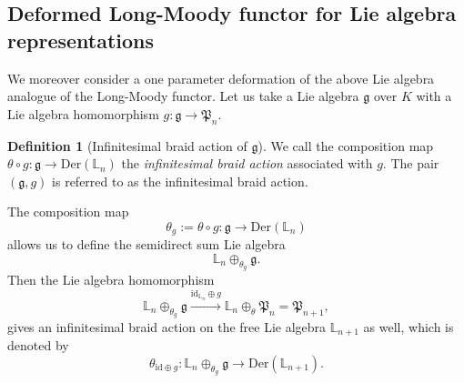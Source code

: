 \documentclass[a4paper,12pt]{article}
\theoremstyle{definition}
\newtheorem{df}[thm]{Definition}
\theoremstyle{remark}
\begin{document}
\subsection{Deformed Long-Moody functor for Lie algebra representations}
We moreover consider a one parameter deformation of the above Lie algebra analogue of the Long-Moody functor.
Let us take a Lie algebra $\mathfrak{g}$ over $K$ with 
a Lie algebra homomorphism $g\colon \mathfrak{g}\to \mathfrak{P}_{n}$.
\begin{df}[Infinitesimal braid action of $\mathfrak{g}$]
	We call the composition map $\theta\circ g\colon \mathfrak{g}\to \mathrm{Der}(\mathbb{L}_{n})$ 
	the \emph{infinitesimal braid action}
	associated with $g$. The pair $(\mathfrak{g}, g)$
	is referred to as the infinitesimal braid action.
\end{df}	
The composition map 
\[
	\theta_{g}:=\theta\circ g\colon \mathfrak{g}\to \mathrm{Der}(\mathbb{L}_{n})
\]
allows us to define the semidirect sum Lie algebra
\[
	\mathbb{L}_{n}\oplus_{\theta_{g}} \mathfrak{g}.
\]
Then the Lie algebra homomorphism
\[
	\mathbb{L}_{n}\oplus_{\theta_{g}} \mathfrak{g}
	\xrightarrow[]{\mathrm{id}_{\mathbb{L}_{n}}\oplus g}
	\mathbb{L}_{n}\oplus_{\theta} \mathfrak{P}_{n}=\mathfrak{P}_{n+1},
\]
gives an infinitesimal braid action
on the free Lie algebra $\mathbb{L}_{n+1}$ as well, 
which is denoted by 
\[
	\theta_{\mathrm{id}\oplus g}\colon \mathbb{L}_{n}\oplus_{\theta_{g}} \mathfrak{g}
	\longrightarrow \mathrm{Der}(\mathbb{L}_{n+1}).
\]
\end{document}
